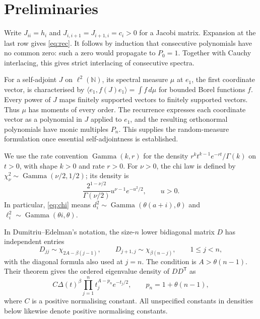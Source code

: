 \documentclass[10pt]{amsart}
\newcommand{\T}{\mathsf T}
\begin{document}
\section{Preliminaries}
Write $J_{ii}=h_i$ and $J_{i,i+1}=J_{i+1,i}=c_i>0$ for a Jacobi matrix.
Expansion at the last row gives \eqref{eq:rec}. It follows by induction
that consecutive polynomials have no common zero: such a zero would
propagate to $P_0=1$. Together with Cauchy interlacing, this gives
strict interlacing of consecutive spectra.

For a self-adjoint $J$ on $\ell^2(\mathbb N)$, its spectral measure
$\mu$ at $e_1$, the first coordinate vector, is characterised by
$\langle e_1,f(J)e_1\rangle=\int f\,d\mu$ for bounded Borel functions
$f$. Every power of $J$ maps finitely supported vectors to finitely
supported vectors. Thus $\mu$ has moments of every order.
The recurrence expresses each coordinate vector as a polynomial in
$J$ applied to $e_1$, and the resulting orthonormal polynomials have
monic multiples $P_n$. This supplies the random-measure formulation
once essential self-adjointness is established.

We use the rate convention
$\operatorname{Gamma}(k,r)$ for the density
$r^k t^{k-1}e^{-rt}/\Gamma(k)$ on $t>0$, with shape $k>0$ and rate
$r>0$. For $\nu>0$, the chi law is defined by
$\chi_\nu^2\sim\operatorname{Gamma}(\nu/2,1/2)$; its density is
\begin{equation}\label{eq:chidensity}
 \frac{2^{1-\nu/2}}{\Gamma(\nu/2)}u^{\nu-1}e^{-u^2/2},\qquad u>0.
\end{equation}
In particular, \eqref{eq:chi} means
$d_i^2\sim\operatorname{Gamma}(\theta(a+i),\theta)$ and
$\ell_i^2\sim\operatorname{Gamma}(\theta i,\theta)$.

In Dumitriu--Edelman's notation, the size-$n$ lower bidiagonal matrix
$D$ has independent entries
\begin{equation}\label{eq:DE}
 D_{jj}\sim\chi_{2A-\beta(j-1)},\qquad
 D_{j+1,j}\sim\chi_{\beta(n-j)},\qquad 1\leq j<n,
\end{equation}
with the diagonal formula also used at $j=n$.
The condition is $A>\theta(n-1)$. Their theorem gives the ordered
eigenvalue density of $DD^\T$ as
\begin{equation}\label{eq:DEdensity}
 C\Delta(t)^\beta\prod_{j=1}^n
 t_j^{A-p_n}e^{-t_j/2},\qquad p_n=1+\theta(n-1),
\end{equation}
where $C$ is a positive normalising constant. All unspecified constants
in densities below likewise denote positive normalising constants.
\end{document}
